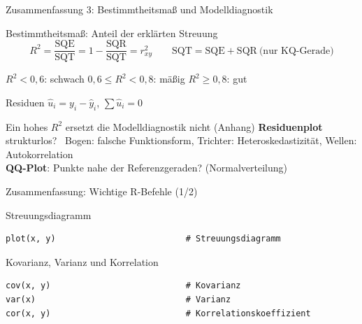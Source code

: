 \documentclass[aspectratio=169,11pt]{beamer}
\begin{document}
\begin{frame}{Zusammenfassung 3: Bestimmtheitsmaß und Modelldiagnostik}
  \begin{block}{Bestimmtheitsmaß: Anteil der erklärten Streuung}
    \vspace{-4pt}
    \[
      R^{2} = \frac{\text{SQE}}{\text{SQT}} = 1 - \frac{\text{SQR}}{\text{SQT}} = r_{xy}^{2}
      \qquad
      \text{SQT} = \text{SQE} + \text{SQR} \ \text{(nur KQ-Gerade)}
    \]
    \vspace{-8pt}

    $R^2 < 0{,}6$: schwach \qquad $0{,}6 \le R^2 < 0{,}8$: mäßig \qquad $R^2 \ge 0{,}8$: gut
  \end{block}

  \medskip

  \begin{block}{Residuen}
    $\hat{u}_i = y_i - \hat{y}_i$, \quad $\sum \hat{u}_i = 0$
  \end{block}

  \medskip

  \begin{alertblock}{Ein hohes $R^{2}$ ersetzt die Modelldiagnostik nicht (Anhang)}
    \textbf{Residuenplot} strukturlos? \ Bogen: falsche Funktionsform, Trichter:
    Heteroskedastizität, Wellen: Autokorrelation\\
    \textbf{QQ-Plot}: Punkte nahe der Referenzgeraden? (Normalverteilung)
  \end{alertblock}
\end{frame}

\begin{frame}[fragile]{Zusammenfassung: Wichtige R-Befehle (1/2)}
  \begin{block}{Streuungsdiagramm}
\begin{lstlisting}
plot(x, y)                          # Streuungsdiagramm
\end{lstlisting}
  \end{block}

  \vspace{0.3cm}

  \begin{block}{Kovarianz, Varianz und Korrelation}
\begin{lstlisting}
cov(x, y)                           # Kovarianz
var(x)                              # Varianz
cor(x, y)                           # Korrelationskoeffizient
\end{lstlisting}
  \end{block}
\end{frame}
\end{document}
